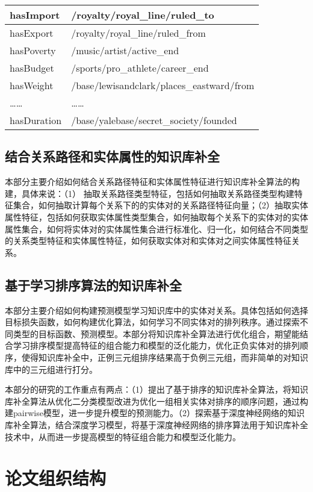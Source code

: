 \begin{table}[htbp]
\begin{tabular}{|l|l|}
    hasImport  & /royalty/royal\_line/ruled\_to \\
    \hline
    hasExport  & /royalty/royal\_line/ruled\_from \\
    \hline
    hasPoverty  & /music/artist/active\_end \\
    \hline
    hasBudget  & /sports/pro\_athlete/career\_end \\
    \hline
    hasWeight  & /base/lewisandclark/places\_eastward/from \\
    \hline
    ……  & ……\\
    \hline
    hasDuration  & /base/yalebase/secret\_society/founded \\
    \hline
    \end{tabular}%
  \label{tab:addlabel-attr}%
\end{table}%

\subsection{结合关系路径和实体属性的知识库补全}
本部分主要介绍如何结合关系路径特征和实体属性特征进行知识库补全算法的构建，具体来说：（1）
抽取关系路径类型特征，包括如何抽取关系路径类型构建特征集合，如何抽取计算每个关系下的的实体对的关系路径特征向量；（2）抽取实体属性特征，包括如何获取实体属性类型集合，如何抽取每个关系下的实体对的实体属性集合，如何将实体对的实体属性集合进行标准化、归一化，如何结合不同类型的关系类型特征和实体属性特征，如何获取实体对和实体对之间实体属性特征关系。

\subsection{基于学习排序算法的知识库补全}
本部分主要介绍如何构建预测模型学习知识库中的实体对关系。具体包括如何选择目标损失函数，如何构建优化算法，如何学习不同实体对的排列秩序。通过探索不同类型的目标函数、预测模型。本部分将知识库补全算法进行优化组合，期望能结合学习排序模型提高特征的组合能力和模型的泛化能力，优化正负实体对的排列顺序，使得知识库补全中，正例三元组排序结果高于负例三元组，而非简单的对知识库中的三元组进行打分。

本部分的研究的工作重点有两点：（1）提出了基于排序的知识库补全算法，将知识库补全算法从优化二分类模型改进为优化一组相关实体对排序的顺序问题，通过构建pairwise模型，进一步提升模型的预测能力。（2）探索基于深度神经网络的知识库补全算法，结合深度学习模型，将基于深度神经网络的排序算法用于知识库补全技术中，从而进一步提高模型的特征组合能力和模型泛化能力。

\section{论文组织结构}

